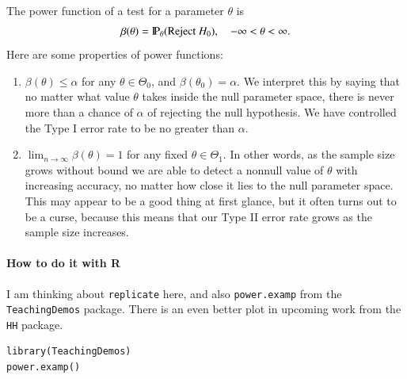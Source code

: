 \documentclass[captions=tableheading]{scrbook}
\begin{document}
The power function of a test for a parameter \(\theta\) is
\[
\beta(\theta)=\P_{\theta}(\mbox{Reject }H_{0}),\quad-\infty<\theta<\infty.
\]
Here are some properties of power functions:
\begin{enumerate}
\item \(\beta(\theta)\leq\alpha\) for any \(\theta\in\Theta_{0}\), and \(\beta(\theta_{0})=\alpha\). We interpret this by saying that no matter what value \(\theta\) takes inside the null parameter space, there is never more than a chance of \(\alpha\) of rejecting the null hypothesis. We have controlled the Type I error rate to be no greater than \(\alpha\).
\item \(\lim_{n\to\infty}\beta(\theta)=1\) for any fixed \(\theta\in\Theta_{1}\). In other words, as the sample size grows without bound we are able to detect a nonnull value of \(\theta\) with increasing accuracy, no matter how close it lies to the null parameter space. This may appear to be a good thing at first glance, but it often turns out to be a curse, because this means that our Type II error rate grows as the sample size increases.
\end{enumerate}

\paragraph*{How to do it with \textsf{R}}

I am thinking about \texttt{replicate} here, and also \texttt{power.examp} from the \texttt{TeachingDemos} package. There is an even better plot in upcoming work from the \texttt{HH} package.


\begin{verbatim}
library(TeachingDemos)
power.examp()
\end{verbatim}
\end{document}
